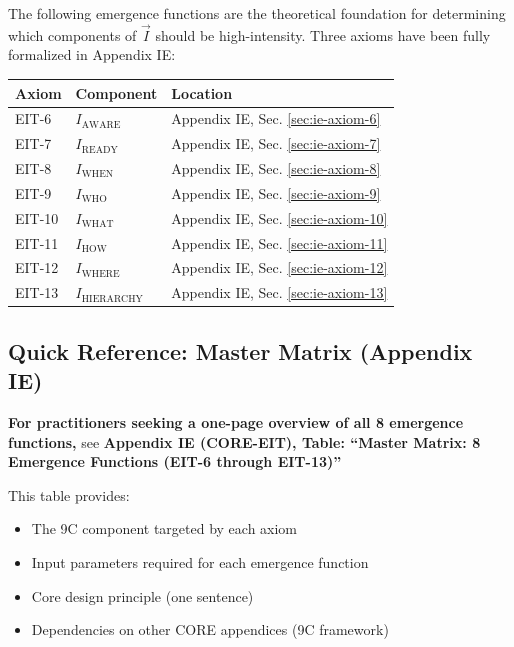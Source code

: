 \begin{tcolorbox}[colback=red!5!white, colframe=red!75!black,
    title=\textbf{Foundation: Theory in Appendix IE (CORE-EIT)}]

The following emergence functions are the theoretical foundation for determining which components of $\vec{I}$ should be high-intensity. Three axioms have been fully formalized in Appendix IE:

\begin{center}
\renewcommand{\arraystretch}{1.3}
\begin{tabular}{@{}lll@{}}
\toprule
\textbf{Axiom} & \textbf{Component} & \textbf{Location} \\
\midrule
EIT-6 & $I_{\text{AWARE}}$ & Appendix IE, Sec. \ref{sec:ie-axiom-6} \\
EIT-7 & $I_{\text{READY}}$ & Appendix IE, Sec. \ref{sec:ie-axiom-7} \\
EIT-8 & $I_{\text{WHEN}}$ & Appendix IE, Sec. \ref{sec:ie-axiom-8} \\
EIT-9 & $I_{\text{WHO}}$ & Appendix IE, Sec. \ref{sec:ie-axiom-9} \\
EIT-10 & $I_{\text{WHAT}}$ & Appendix IE, Sec. \ref{sec:ie-axiom-10} \\
EIT-11 & $I_{\text{HOW}}$ & Appendix IE, Sec. \ref{sec:ie-axiom-11} \\
EIT-12 & $I_{\text{WHERE}}$ & Appendix IE, Sec. \ref{sec:ie-axiom-12} \\
EIT-13 & $I_{\text{HIERARCHY}}$ & Appendix IE, Sec. \ref{sec:ie-axiom-13} \\
\bottomrule
\end{tabular}
\end{center}

\end{tcolorbox}

\subsection{Quick Reference: Master Matrix (Appendix IE)}

\textbf{For practitioners seeking a one-page overview of all 8 emergence functions,} see \textbf{Appendix IE (CORE-EIT), Table: ``Master Matrix: 8 Emergence Functions (EIT-6 through EIT-13)''}

This table provides:
\begin{itemize}[nosep]
\item The 9C component targeted by each axiom
\item Input parameters required for each emergence function
\item Core design principle (one sentence)
\item Dependencies on other CORE appendices (9C framework)
\end{itemize}

